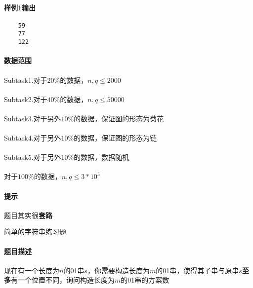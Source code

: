 \documentclass[UTF8]{ctexart}
\begin{document}
\paragraph{样例1输出}
\begin{lstlisting}
    59
    77
    122
\end{lstlisting}
\paragraph{数据范围}
\paragraph{}Subtask1.对于$20\%$的数据，$n,q\leq 2000$
\paragraph{}Subtask2.对于$40\%$的数据，$n,q\leq 50000$
\paragraph{}Subtask3.对于另外$10\%$的数据，保证图的形态为菊花
\paragraph{}Subtask4.对于另外$10\%$的数据，保证图的形态为链
\paragraph{}Subtask5.对于另外$10\%$的数据，数据随机
\paragraph{}对于$100\%$的数据，$n,q\leq 3*10^5$
\paragraph{提示}
\paragraph{}题目其实很\textbf{套路}

\clearpage

\begin{center}
    \large{简单的字符串练习题}
\end{center}
\paragraph{题目描述}
\paragraph{}现在有一个长度为$n$的01串$s$，你需要构造长度为$m$的01串，使得其子串与原串$s$\textbf{至多}有一个位置不同，询问构造长度为$m$的01串的方案数
\end{document}
